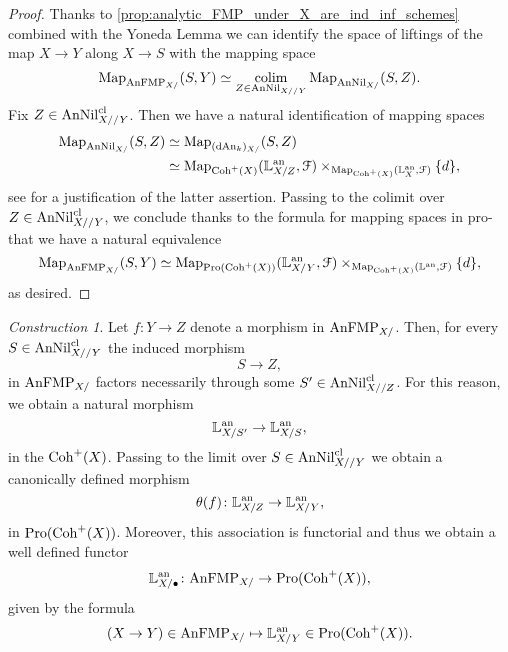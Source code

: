 \documentclass[10pt,a4paper,reqno]{amsart} %
\theoremstyle{plain}
\theoremstyle{definition}
\theoremstyle{remark}
\numberwithin{equation}{section}
\newtheorem{construction}[thm]{Construction}
\begin{document}
\begin{proof}
    Thanks to \cref{prop:analytic_FMP_under_X_are_ind_inf_schemes} combined with the Yoneda Lemma
    we can identify the space of liftings of the map $X \to Y$ along $X \to S$ with the mapping space
        \[
            \operatorname{Map}_{\mathrm{AnFMP}_{X/}}(S, Y) \simeq \operatorname*{colim}_{Z \in \mathrm{AnNil}_{X//Y}} \operatorname{Map}_{\mathrm{AnNil}_{X/}} (S, Z).  
        \]
    Fix $Z \in \mathrm{AnNil}_{X//Y}^{\mathrm{cl}}$. Then we have a natural identification of mapping spaces
        \begin{align} \label{eq:identification_of_universal_property_of_rel_an_cotagent_complex}
            \operatorname{Map}_{\mathrm{AnNil}_{X/}} (S, Z) & \simeq \operatorname{Map}_{(\mathrm{dAn}_k)_{X/}} (S, Z) \\
                                      & \simeq \operatorname{Map}_{\mathrm{Coh}^+(X)}(\mathbb L^\mathrm{an}_{X/Z}, \mathcal F) \times_{\operatorname{Map}_{\mathrm{Coh}^+(X)}(\mathbb L^\mathrm{an}_X, \mathcal F)} \{ d \},
        \end{align}
    see \cite[\S 5.4]{Porta_Yu_Representability} for a justification of the latter assertion.
    Passing to the colimit over $Z \in \mathrm{AnNil}_{X//Y}^{\mathrm{cl}}$, we conclude thanks to the formula for mapping spaces in pro-\infcats that we have
    a natural equivalence
        \[
            \operatorname{Map}_{\mathrm{AnFMP}_{X/}}(S, Y) \simeq \operatorname{Map}_{\mathrm{Pro}(\mathrm{Coh}^+(X))}(\mathbb L^\mathrm{an}_{X/Y}, \mathcal F) \times_{\operatorname{Map}_{\mathrm{Coh}^+(X)}(\mathbb L^\mathrm{an}, \mathcal F)} \{ d \},
        \]
    as desired.
\end{proof}

\begin{construction} \label{rem:morphisms_of_AnFMP_induce_transition_morphisms_on_relative_analytic_cot_complexes}
    Let $f \colon Y \to Z$ denote a morphism in $\mathrm{AnFMP}_{X/}$. Then, for every $S \in \mathrm{AnNil}_{X/ /Y}^{\mathrm{cl}}$ the induced morphism
        \[
            S \to Z,   
        \]
    in $\mathrm{AnFMP}_{X/}$ factors necessarily through some $S' \in \mathrm{AnNil}^{\mathrm{cl}}_{X/ /Z}$. For this reason, we obtain a natural morphism
        \[
            \mathbb L^\mathrm{an}_{X/S'} \to \mathbb L^\mathrm{an}_{X/S},  
        \]
    in the \infcat $\mathrm{Coh}^+(X)$. Passing to the limit over $S \in \mathrm{AnNil}^{\mathrm{cl}}_{X//Y}$ we obtain a canonically defined morphism
        \[
            \theta (f) \colon \mathbb L^\mathrm{an}_{X/Z} \to \mathbb L^\mathrm{an}_{X/Y},  
        \]
    in $\mathrm{Pro}(\mathrm{Coh}^+(X))$. Moreover, this association is functorial and thus we obtain a well defined functor
        \[
            \mathbb L^\mathrm{an}_{X/ \bullet} \colon \mathrm{AnFMP}_{X/ } \to \mathrm{Pro}(\mathrm{Coh}^+(X)),  
        \]
    given by the formula
        \[
            (X \to Y) \in \mathrm{AnFMP}_{X/ } \mapsto \mathbb L^\mathrm{an}_{X/ Y} \in \mathrm{Pro}(\mathrm{Coh}^+(X)).  
        \]
\end{construction}
\end{document}
